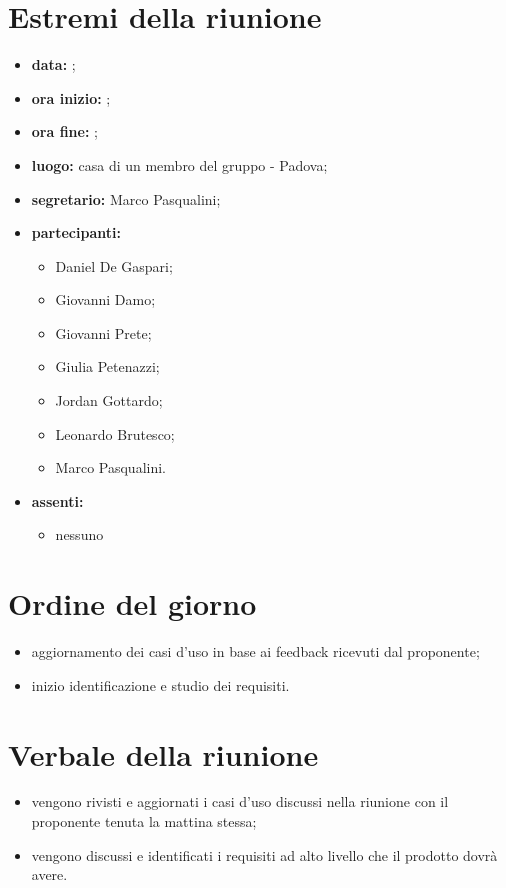 \documentclass[a4paper,11pt]{article}
\begin{document}
	\section{Estremi della riunione}
	\begin{itemize}
		\item \textbf{data:} ;
		\item \textbf{ora inizio:} ;
		\item \textbf{ora fine:} ;
		\item \textbf{luogo:} casa di un membro del gruppo - Padova;
		\item \textbf{segretario:} Marco Pasqualini;
		\item \textbf{partecipanti:}
			\begin{itemize}
				\item Daniel De Gaspari;
				\item Giovanni Damo;
				\item Giovanni Prete;
				\item Giulia Petenazzi;
				\item Jordan Gottardo;
				\item Leonardo Brutesco;
				\item Marco Pasqualini.
			\end{itemize}
		\item \textbf{assenti:}
			\begin{itemize}
			 \item nessuno
			\end{itemize}
	\end{itemize}
	\section{Ordine del giorno}
		\begin{itemize}
				\item aggiornamento dei casi d'uso in base ai feedback ricevuti dal proponente;
				\item inizio identificazione e studio dei requisiti.
		\end{itemize}
	\section{Verbale della riunione}
		\begin{itemize}
		\item vengono rivisti e aggiornati i casi d'uso discussi nella riunione con il proponente tenuta la mattina stessa;
		\item vengono discussi e identificati i requisiti ad alto livello che il prodotto dovrà avere.
		\end{itemize}
\end{document}
